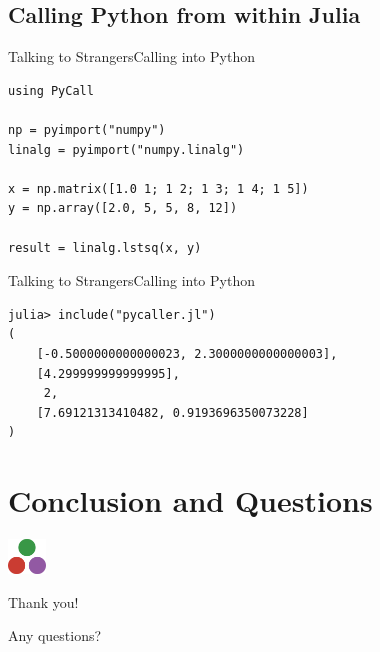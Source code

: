 \documentclass[11pt]{beamer}
\begin{document}
\subsection{Calling Python from within Julia}
\begin{frame}[fragile]{Talking to Strangers}{Calling into Python}
\begin{lstlisting}
using PyCall

np = pyimport("numpy")
linalg = pyimport("numpy.linalg")

x = np.matrix([1.0 1; 1 2; 1 3; 1 4; 1 5])
y = np.array([2.0, 5, 5, 8, 12])

result = linalg.lstsq(x, y)
\end{lstlisting}
\end{frame}

\begin{frame}[fragile]{Talking to Strangers}{Calling into Python}
\begin{lstlisting}
julia> include("pycaller.jl")
(
	[-0.5000000000000023, 2.3000000000000003], 
	[4.299999999999995], 
	 2, 
	[7.69121313410482, 0.9193696350073228]
)
\end{lstlisting}
\end{frame}



\section{Conclusion and Questions}
\begin{frame}
\begin{center}
\includegraphics[width=1cm]{images/julia.png}

Thank you!

Any questions? \Coffeecup
\end{center}
\end{frame}
\end{document}
